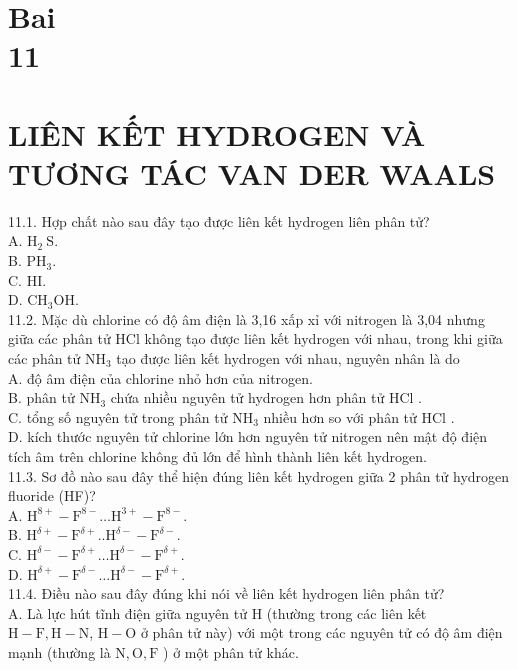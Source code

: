 \documentclass[10pt]{article}
\begin{document}
\section*{Bai \\
 11}
\section*{LIÊN KẾT HYDROGEN VÀ TƯƠNG TÁC VAN DER WAALS}
11.1. Hợp chất nào sau đây tạo được liên kết hydrogen liên phân tử?\\
A. $\mathrm{H}_{2} \mathrm{~S}$.\\
B. $\mathrm{PH}_{3}$.\\
C. HI.\\
D. $\mathrm{CH}_{3} \mathrm{OH}$.\\
11.2. Mặc dù chlorine có độ âm điện là 3,16 xấp xỉ với nitrogen là 3,04 nhưng giữa các phân tử HCl không tạo được liên kết hydrogen với nhau, trong khi giữa các phân tử $\mathrm{NH}_{3}$ tạo được liên kết hydrogen với nhau, nguyên nhân là do\\
A. độ âm điện của chlorine nhỏ hơn của nitrogen.\\
B. phân tử $\mathrm{NH}_{3}$ chứa nhiều nguyên tử hydrogen hơn phân tử HCl .\\
C. tổng số nguyên tử trong phân tử $\mathrm{NH}_{3}$ nhiều hơn so với phân tử HCl .\\
D. kích thước nguyên tử chlorine lớn hơn nguyên tử nitrogen nên mật độ điện tích âm trên chlorine không đủ lớn để hình thành liên kết hydrogen.\\
11.3. Sơ đồ nào sau đây thể hiện đúng liên kết hydrogen giữa 2 phân tử hydrogen fluoride (HF)?\\
A. $\mathrm{H}^{8+}-\mathrm{F}^{8-} \ldots \mathrm{H}^{3+}-\mathrm{F}^{8-}$.\\
B. $\mathrm{H}^{\delta+}-\mathrm{F}^{\delta+} . . \mathrm{H}^{\delta-}-\mathrm{F}^{\delta-}$.\\
C. $\mathrm{H}^{\delta-}-\mathrm{F}^{\delta+} \ldots \mathrm{H}^{\delta-}-\mathrm{F}^{\delta+}$.\\
D. $\mathrm{H}^{\delta+}-\mathrm{F}^{\delta-} \ldots \mathrm{H}^{\delta-}-\mathrm{F}^{\delta+}$.\\
11.4. Điều nào sau đây đúng khi nói về liên kết hydrogen liên phân tử?\\
A. Là lực hút tĩnh điện giữa nguyên tử H (thường trong các liên kết $\mathrm{H}-\mathrm{F}, \mathrm{H}-\mathrm{N}$, $\mathrm{H}-\mathrm{O}$ ở phân tử này) với một trong các nguyên tử có độ âm điện mạnh (thường là $\mathrm{N}, \mathrm{O}, \mathrm{F}$ ) ở một phân tử khác.\\
\end{document}
